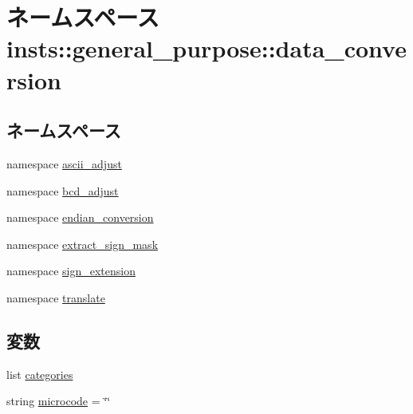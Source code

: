 \hypertarget{namespaceinsts_1_1general__purpose_1_1data__conversion}{
\section{ネームスペース insts::general\_\-purpose::data\_\-conversion}
\label{namespaceinsts_1_1general__purpose_1_1data__conversion}
}
\subsection*{ネームスペース}
\begin{DoxyCompactItemize}
\item 
namespace \hyperlink{namespaceinsts_1_1general__purpose_1_1data__conversion_1_1ascii__adjust}{ascii\_\-adjust}
\item 
namespace \hyperlink{namespaceinsts_1_1general__purpose_1_1data__conversion_1_1bcd__adjust}{bcd\_\-adjust}
\item 
namespace \hyperlink{namespaceinsts_1_1general__purpose_1_1data__conversion_1_1endian__conversion}{endian\_\-conversion}
\item 
namespace \hyperlink{namespaceinsts_1_1general__purpose_1_1data__conversion_1_1extract__sign__mask}{extract\_\-sign\_\-mask}
\item 
namespace \hyperlink{namespaceinsts_1_1general__purpose_1_1data__conversion_1_1sign__extension}{sign\_\-extension}
\item 
namespace \hyperlink{namespaceinsts_1_1general__purpose_1_1data__conversion_1_1translate}{translate}
\end{DoxyCompactItemize}
\subsection*{変数}
\begin{DoxyCompactItemize}
\item 
list \hyperlink{namespaceinsts_1_1general__purpose_1_1data__conversion_a273cf0f1630af14c1582f05e53354a55}{categories}
\item 
string \hyperlink{namespaceinsts_1_1general__purpose_1_1data__conversion_a770f11a173e99389a8802f0107ed8f52}{microcode} = \char`\"{}\char`\"{}
\end{DoxyCompactItemize}


